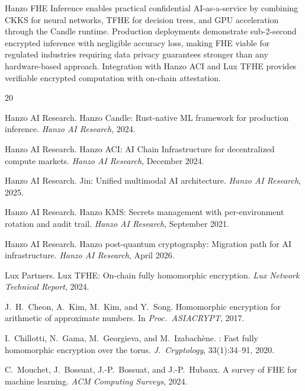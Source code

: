 \documentclass[11pt]{article}
\begin{document}
Hanzo FHE Inference enables practical confidential AI-as-a-service by combining
CKKS for neural networks, TFHE for decision trees, and GPU acceleration through
the Candle runtime. Production deployments demonstrate sub-2-second encrypted
inference with negligible accuracy loss, making FHE viable for regulated
industries requiring data privacy guarantees stronger than any hardware-based
approach. Integration with Hanzo ACI and Lux TFHE provides verifiable encrypted
computation with on-chain attestation.

\label{sec:threshold}

\begin{thebibliography}{20}

{Hanzo AI Research}.
\newblock Hanzo Candle: Rust-native {ML} framework for production inference.
\newblock \emph{Hanzo AI Research}, 2024.

{Hanzo AI Research}.
\newblock Hanzo {ACI}: {AI} Chain Infrastructure for decentralized compute markets.
\newblock \emph{Hanzo AI Research}, December 2024.

{Hanzo AI Research}.
\newblock Jin: Unified multimodal {AI} architecture.
\newblock \emph{Hanzo AI Research}, 2025.

{Hanzo AI Research}.
\newblock Hanzo {KMS}: Secrets management with per-environment rotation and audit trail.
\newblock \emph{Hanzo AI Research}, September 2021.

{Hanzo AI Research}.
\newblock Hanzo post-quantum cryptography: Migration path for {AI} infrastructure.
\newblock \emph{Hanzo AI Research}, April 2026.

{Lux Partners}.
\newblock Lux {TFHE}: On-chain fully homomorphic encryption.
\newblock \emph{Lux Network Technical Report}, 2024.

J.~H.~Cheon, A.~Kim, M.~Kim, and Y.~Song.
\newblock Homomorphic encryption for arithmetic of approximate numbers.
\newblock In \emph{Proc.\ ASIACRYPT}, 2017.

I.~Chillotti, N.~Gama, M.~Georgieva, and M.~Izabach\`ene.
: Fast fully homomorphic encryption over the torus.
\newblock \emph{J.\ Cryptology}, 33(1):34--91, 2020.

C.~Mouchet, J.~Bossuat, J.-P.~Bossuat, and J.-P.~Hubaux.
\newblock A survey of {FHE} for machine learning.
\newblock \emph{ACM Computing Surveys}, 2024.


\end{thebibliography}
\end{document}
